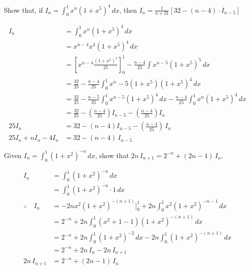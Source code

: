 \documentclass{standalone}
\begin{document}
	\begin{example}
		Show that, if $I_n= \int_0^1 x^n(1+x^5)^4 \, dx$, then $I_n = \frac1{n+21} \left[32-(n-4)\cdot I_{n-5}\right]$
	\end{example}
	
	\begin{align*}
		I_n                 & = \int_0^1 x^n(1+x^5)^4 \, dx                                                                           \\
		& = x^{n-4}x^4(1+x^5)^4\,dx                                                                               \\
		& =\left[x^{n-4} \frac{(1+x^5)^5}{25}\right]_0^1 - \frac{n-4}{25} \int x^{n-5}(1+x^5)^5\,dx               \\
		& = \frac{32}{25}  -\frac{n-4}{25} \int_0^1x^n-5(1+x^5)(1+x^5)^4\,dx                                      \\
		& = \frac{32}{25} - \frac{n-5}{25}\int_0^1x^{n-5}(1+x^5)^4\, dx - \frac{n-4}{25}\int_0^1x^n(1+x^5)^4\, dx \\
		& = \frac{32}{25} - \left(\frac{n-4}{25}\right)I_{n-5} - \left(\frac{n-4}{25}\right)I_n                   \\
		25I_n               & = 32 - (n-4)I_{n-5} - \left(\frac{n-4}{25}\right)\,I_n                                                  \\
		25I_n + nI_n - 4I_n & = 32 -(n-4)\,I_{n-5}                                                                                    
	\end{align*}
	
	\begin{example}
		Given $I_n = \int_0^1 (1+x^2)^{-n}\,dx$, show that $2n\,I_{n+1} = 2^{-n} + (2n-1)\,I_n$.
	\end{example}
	\begin{align*}
		I_n                   & = \int_0^1 (1+x^2)^{-n}\,dx                                             \\
		& = \int_0^1  (1+x^2)^{-n}\cdot 1 \,dx                                    \\
		\therefore \quad  I_n & = -2nx^2(1+x^2)^{-(n+1)}\bigg|_0^1 + 2n \int_0^1x^2(1+x^2)^{-n-1}\,dx   \\
						   	  & =2^{-n} + 2n\int_0^1(x^2+1-1)(1+x^2)^{-(n+1)}\,dx                       \\
						      & =2^{-n} + 2n \int_0^1(1+x^2)^{-2}\,dx - 2n\int_0^1 (1+x^2)^{-(n+1)}\,dx \\
							  & = 2^{-n} + 2n\,I_n - 2n\,I_{n+1}                                        \\
           	      2n\,I_{n+1} & = 2^{-n} + (2n-1)\,I_n                                                 
	\end{align*}
\end{document}
